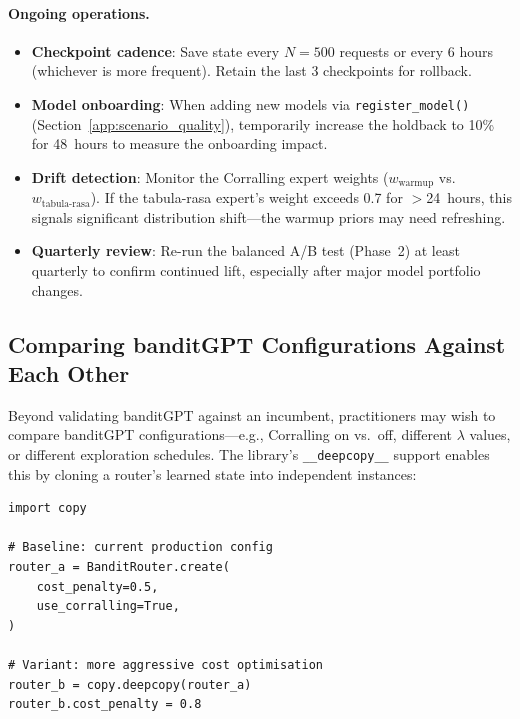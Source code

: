 \paragraph{Ongoing operations.}
\begin{itemize}[nosep,leftmargin=*]
    \item \textbf{Checkpoint cadence}: Save state every $N{=}500$ requests or every 6 hours (whichever is more frequent).  Retain the last 3 checkpoints for rollback.
    \item \textbf{Model onboarding}: When adding new models via \texttt{register\_model()} (Section~\ref{app:scenario_quality}), temporarily increase the holdback to 10\% for 48~hours to measure the onboarding impact.
    \item \textbf{Drift detection}: Monitor the Corralling expert weights ($w_{\mathrm{warmup}}$ vs.\ $w_{\mathrm{tabula\text{-}rasa}}$).  If the tabula-rasa expert's weight exceeds 0.7 for $>$24~hours, this signals significant distribution shift---the warmup priors may need refreshing.
    \item \textbf{Quarterly review}: Re-run the balanced A/B test (Phase~2) at least quarterly to confirm continued lift, especially after major model portfolio changes.
\end{itemize}


\subsection{Comparing banditGPT Configurations Against Each Other}
\label{app:ab_config}

Beyond validating banditGPT against an incumbent, practitioners may wish to compare banditGPT configurations---e.g., Corralling on vs.\ off, different $\lambda$ values, or different exploration schedules.
The library's \texttt{\_\_deepcopy\_\_} support enables this by cloning a router's learned state into independent instances:

{\small\begin{verbatim}
import copy

# Baseline: current production config
router_a = BanditRouter.create(
    cost_penalty=0.5,
    use_corralling=True,
)

# Variant: more aggressive cost optimisation
router_b = copy.deepcopy(router_a)
router_b.cost_penalty = 0.8
\end{verbatim}}

